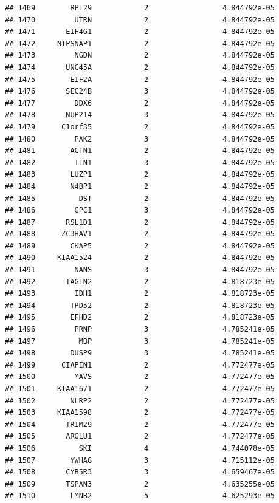 \documentclass[
]{article}
\begin{document}
\begin{verbatim}
## 1469        RPL29            2                 4.844792e-05
## 1470         UTRN            2                 4.844792e-05
## 1471       EIF4G1            2                 4.844792e-05
## 1472     NIPSNAP1            2                 4.844792e-05
## 1473         NGDN            2                 4.844792e-05
## 1474       UNC45A            2                 4.844792e-05
## 1475        EIF2A            2                 4.844792e-05
## 1476       SEC24B            3                 4.844792e-05
## 1477         DDX6            2                 4.844792e-05
## 1478       NUP214            3                 4.844792e-05
## 1479      C1orf35            2                 4.844792e-05
## 1480         PAK2            3                 4.844792e-05
## 1481        ACTN1            2                 4.844792e-05
## 1482         TLN1            3                 4.844792e-05
## 1483        LUZP1            2                 4.844792e-05
## 1484        N4BP1            2                 4.844792e-05
## 1485          DST            2                 4.844792e-05
## 1486         GPC1            3                 4.844792e-05
## 1487       RSL1D1            2                 4.844792e-05
## 1488      ZC3HAV1            2                 4.844792e-05
## 1489        CKAP5            2                 4.844792e-05
## 1490     KIAA1524            2                 4.844792e-05
## 1491         NANS            3                 4.844792e-05
## 1492       TAGLN2            2                 4.818723e-05
## 1493         IDH1            2                 4.818723e-05
## 1494        TPD52            2                 4.818723e-05
## 1495        EFHD2            2                 4.818723e-05
## 1496         PRNP            3                 4.785241e-05
## 1497          MBP            3                 4.785241e-05
## 1498        DUSP9            3                 4.785241e-05
## 1499      CIAPIN1            2                 4.772477e-05
## 1500         MAVS            2                 4.772477e-05
## 1501     KIAA1671            2                 4.772477e-05
## 1502        NLRP2            2                 4.772477e-05
## 1503     KIAA1598            2                 4.772477e-05
## 1504       TRIM29            2                 4.772477e-05
## 1505       ARGLU1            2                 4.772477e-05
## 1506          SKI            4                 4.744078e-05
## 1507        YWHAG            3                 4.715112e-05
## 1508       CYB5R3            3                 4.659467e-05
## 1509       TSPAN3            2                 4.635255e-05
## 1510        LMNB2            5                 4.625293e-05

\end{verbatim}
\end{document}
